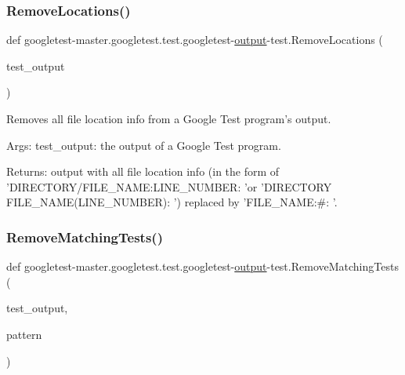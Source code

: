 \subsubsection{\texorpdfstring{RemoveLocations()}{RemoveLocations()}}
{\footnotesize\ttfamily def googletest-\/master.\+googletest.\+test.\+googletest-\/\mbox{\hyperlink{namespacegoogletest-master_1_1googletest_1_1test_1_1googletest-output-test_a734f0a5bd94ba038f4350763c6977129}{output}}-\/test.\+Remove\+Locations (\begin{DoxyParamCaption}\item[{}]{test\+\_\+output }\end{DoxyParamCaption})}

\begin{DoxyVerb}Removes all file location info from a Google Test program's output.

Args:
     test_output:  the output of a Google Test program.

Returns:
     output with all file location info (in the form of
     'DIRECTORY/FILE_NAME:LINE_NUMBER: 'or
     'DIRECTORY\\FILE_NAME(LINE_NUMBER): ') replaced by
     'FILE_NAME:#: '.
\end{DoxyVerb}
 \mbox{\label{namespacegoogletest-master_1_1googletest_1_1test_1_1googletest-output-test_a8c537e52507a48e97fa37401b568adba}} 
\subsubsection{\texorpdfstring{RemoveMatchingTests()}{RemoveMatchingTests()}}
{\footnotesize\ttfamily def googletest-\/master.\+googletest.\+test.\+googletest-\/\mbox{\hyperlink{namespacegoogletest-master_1_1googletest_1_1test_1_1googletest-output-test_a734f0a5bd94ba038f4350763c6977129}{output}}-\/test.\+Remove\+Matching\+Tests (\begin{DoxyParamCaption}\item[{}]{test\+\_\+output,  }\item[{}]{pattern }\end{DoxyParamCaption})}

